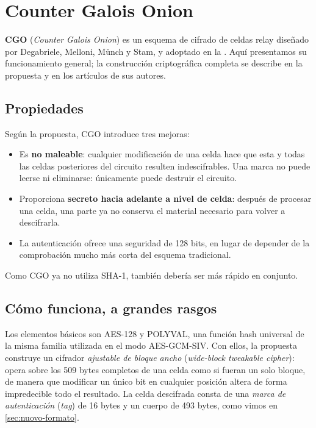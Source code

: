 \section{Counter Galois Onion}\label{sec:cgo}

\textbf{CGO} (\emph{Counter Galois Onion}) es un esquema de cifrado de celdas relay diseñado por Degabriele, Melloni, Münch y Stam, y adoptado en la . Aquí presentamos su funcionamiento general; la construcción criptográfica completa se describe en la propuesta y en los artículos de sus autores.

\subsection{Propiedades}

Según la propuesta, CGO introduce tres mejoras:
\begin{itemize}
  \item Es \textbf{no maleable}: cualquier modificación de una celda hace que esta y todas las celdas posteriores del circuito resulten indescifrables. Una marca no puede leerse ni eliminarse: únicamente puede destruir el circuito.
  \item Proporciona \textbf{secreto hacia adelante a nivel de celda}: después de procesar una celda, una parte ya no conserva el material necesario para volver a descifrarla.
  \item La autenticación ofrece una seguridad de 128 bits, en lugar de depender de la comprobación mucho más corta del esquema tradicional.
\end{itemize}
Como CGO ya no utiliza SHA-1, también debería ser más rápido en conjunto.

\subsection{Cómo funciona, a grandes rasgos}

Los elementos básicos son AES-128 y POLYVAL, una función hash universal de la misma familia utilizada en el modo AES-GCM-SIV. Con ellos, la propuesta construye un cifrador \emph{ajustable de bloque ancho} (\emph{wide-block tweakable cipher}): opera sobre los 509 bytes completos de una celda como si fueran un solo bloque, de manera que modificar un único bit en cualquier posición altera de forma impredecible todo el resultado. La celda descifrada consta de una \emph{marca de autenticación} (\emph{tag}) de 16 bytes y un cuerpo de 493 bytes, como vimos en \cref{sec:nuovo-formato}.

